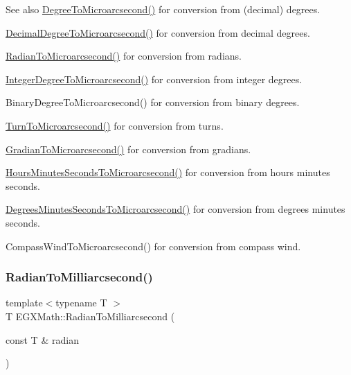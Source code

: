 \begin{DoxySeeAlso}{See also}
\mbox{\hyperlink{group___e_g_x_math-_angle_conversions-_degree_ga31b65388fe1b4656663b3d66b9d764e6}{Degree\+To\+Microarcsecond()}} for conversion from (decimal) degrees. 

\mbox{\hyperlink{group___e_g_x_math-_angle_conversions-_decimal_degree_ga6fa88456069907fd24716fa575517571}{Decimal\+Degree\+To\+Microarcsecond()}} for conversion from decimal degrees. 

\mbox{\hyperlink{group___e_g_x_math-_angle_conversions-_radian_ga3a515ca2838a305fa40750763f546a86}{Radian\+To\+Microarcsecond()}} for conversion from radians. 

\mbox{\hyperlink{group___e_g_x_math-_angle_conversions-_integer_degree_ga69179d6082764595c7014805e1f6b31e}{Integer\+Degree\+To\+Microarcsecond()}} for conversion from integer degrees. 

Binary\+Degree\+To\+Microarcsecond() for conversion from binary degrees. 

\mbox{\hyperlink{group___e_g_x_math-_angle_conversions-_turn_ga41a861a04d65aab05647b32142e6d80d}{Turn\+To\+Microarcsecond()}} for conversion from turns. 

\mbox{\hyperlink{group___e_g_x_math-_angle_conversions-_gradian_gab7781c860ea3ab9c9cf76ab639846a07}{Gradian\+To\+Microarcsecond()}} for conversion from gradians. 

\mbox{\hyperlink{group___e_g_x_math-_angle_conversions-_hours_minutes_seconds_ga061e4fa10d73e459d5f411cfe436bbe3}{Hours\+Minutes\+Seconds\+To\+Microarcsecond()}} for conversion from hours minutes seconds. 

\mbox{\hyperlink{group___e_g_x_math-_angle_conversions-_degrees_minutes_seconds_gabc4de7934e776de13953707344a4da88}{Degrees\+Minutes\+Seconds\+To\+Microarcsecond()}} for conversion from degrees minutes seconds. 

Compass\+Wind\+To\+Microarcsecond() for conversion from compass wind. 
\end{DoxySeeAlso}
\mbox{\label{group___e_g_x_math-_angle_conversions-_radian_ga84fbb494a455cfeb30be62776f96c9a9}} 
\subsubsection{\texorpdfstring{Radian\+To\+Milliarcsecond()}{RadianToMilliarcsecond()}}
{\footnotesize\ttfamily template$<$typename T $>$ \\
T E\+G\+X\+Math\+::\+Radian\+To\+Milliarcsecond (\begin{DoxyParamCaption}\item[{const T \&}]{radian }\end{DoxyParamCaption})}



